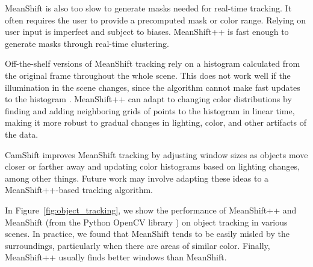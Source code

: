 MeanShift is also too slow to generate masks needed for real-time tracking. It often requires the user to provide a precomputed mask or color range. Relying on user input is imperfect and subject to biases. MeanShift++ is fast enough to generate masks through real-time clustering. 

Off-the-shelf versions of MeanShift tracking rely on a histogram calculated from the original frame throughout the whole scene. This does not work well if the illumination in the scene changes, since the algorithm cannot make fast updates to the histogram \cite{freedman2005illumination,whoang2012object,phadke2013illumination,phadke2017mean}. MeanShift++ can adapt to changing color distributions by finding and adding neighboring grids of points to the histogram in linear time, making it more robust to gradual changes in lighting, color, and other artifacts of the data.

CamShift \cite{bradski1998computer,allen2004object} improves MeanShift tracking by adjusting window sizes as objects move closer or farther away and updating color histograms based on lighting changes, among other things. Future work may involve adapting these ideas to a MeanShift++-based tracking algorithm.

In Figure~\ref{fig:object_tracking}, we show the performance of MeanShift++ and MeanShift (from the Python OpenCV library \cite{bradski2008learning}) on object tracking in various scenes. In practice, we found that MeanShift tends to be easily misled by the surroundings, particularly when there are areas of similar color. Finally, MeanShift++ usually finds better windows than MeanShift.
